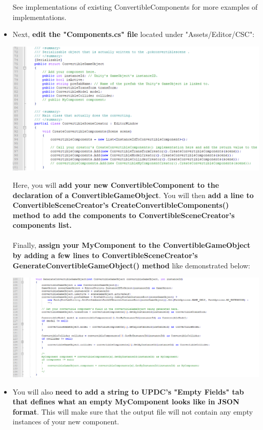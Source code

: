\documentclass[10pt,a4paper]{article}
\begin{document}
\begin{itemize}
See implementations of existing ConvertibleComponents for more examples of implementations.
\newpage
\item Next, \textbf{edit the "Components.cs" file} located under "Assets/Editor/CSC":
\begin{center}
\includegraphics[scale=0.65]{componentsContents0}
\end{center}
Here, you will \textbf{add your new ConvertibleComponent to the declaration of a ConvertibleGameObject}. You will then \textbf{add a line to ConvertibleSceneCreator's CreateConvertibleComponents() method to add the components to ConvertibleSceneCreator's components list.}\\\\
Finally, \textbf{assign your MyComponent to the ConvertibleGameObject by adding a few lines to ConvertibleSceneCreator's GenerateConvertibleGameObject() method} like demonstrated below:
\begin{center}
\includegraphics[scale=0.55]{componentsContents1}
\end{center}
\newpage
\item You will also \textbf{need to add a string to UPDC's "Empty Fields" tab that defines what an empty MyComponent looks like in JSON format}. This will make sure that the output file will not contain any empty instances of your new component.
\begin{center}

\end{center}
\end{itemize}
\end{document}
